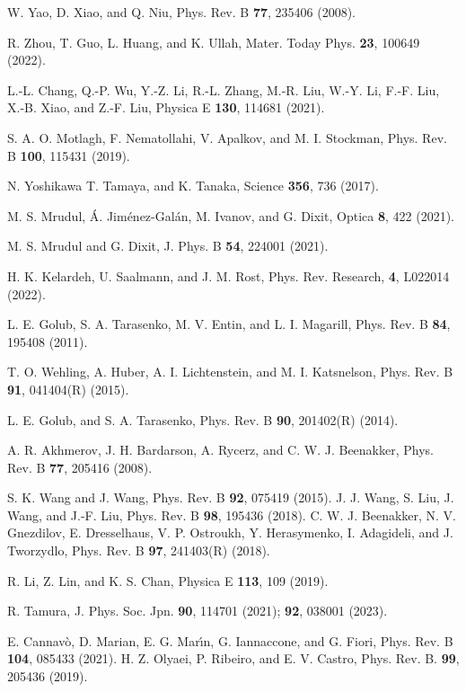 \documentclass{jpsj3}
\begin{document}
\begin{thebibliography}{99}
W. Yao, D. Xiao, and Q. Niu, Phys. Rev. B {\bf 77}, 235406 (2008).

R. Zhou, T. Guo, L. Huang, and K. Ullah, 
Mater. Today Phys. {\bf 23}, 100649 (2022).

L.-L. Chang, Q.-P. Wu, Y.-Z. Li, R.-L. Zhang, M.-R. Liu, W.-Y. Li, F.-F. Liu, X.-B. Xiao, and Z.-F. Liu, Physica E {\bf 130}, 114681 (2021).

 S. A. O. Motlagh, F. Nematollahi, V. Apalkov, and M. I. Stockman, 
Phys. Rev. B {\bf 100}, 115431 (2019).

N. Yoshikawa T. Tamaya, and K. Tanaka, Science {\bf 356}, 736 (2017).

M. S. Mrudul, \'{A}. Jim\'{e}nez-Gal\'{a}n, M. Ivanov, and G. Dixit, Optica {\bf 8}, 422 (2021).

M. S. Mrudul and G. Dixit, J. Phys. B {\bf 54}, 224001 (2021). 

H. K. Kelardeh, U. Saalmann, and J. M. Rost, 
Phys. Rev. Research, {\bf 4}, L022014 (2022).

L. E. Golub, 
S. A. Tarasenko, 
M. V. Entin, and 
L. I. Magarill, 
Phys. Rev. B {\bf 84}, 195408 (2011).


T. O. Wehling, A. Huber, A. I. Lichtenstein, and M. I. Katsnelson, 
Phys. Rev. B {\bf 91}, 041404(R) (2015).

L. E. Golub, and S. A. Tarasenko, 
Phys. Rev. B {\bf 90}, 201402(R) (2014).


 A. R. Akhmerov, J. H. Bardarson, A. Rycerz, and C. W. J. Beenakker, Phys. Rev. B {\bf 77}, 205416 (2008).



S. K. Wang and J. Wang, Phys. Rev. B
{\bf 92}, 075419 (2015).
J. J. Wang, S. Liu, J. Wang, and J.-F. Liu, Phys. Rev. B {\bf 98}, 195436 (2018).
C. W. J. Beenakker, N. V. Gnezdilov, E. Dresselhaus, V. P. Ostroukh, 
Y. Herasymenko, I. Adagideli, and J. Tworzydlo, 
Phys. Rev. B {\bf 97}, 241403(R) (2018).


R. Li, Z. Lin, and K. S. Chan, Physica E {\bf 113}, 109 (2019).


R. Tamura, J. Phys. Soc. Jpn. {\bf 90}, 114701 (2021); {\bf 92}, 038001 (2023).

E. Cannav\`{o}, D. Marian, E. G. Mar\'{\i}n, G. Iannaccone, and G. Fiori, 
Phys. Rev. B {\bf 104}, 085433 (2021).
H. Z. Olyaei, P. Ribeiro, and E. V. Castro, Phys. Rev. B. {\bf 99}, 205436 (2019).


\end{thebibliography}
\end{document}
